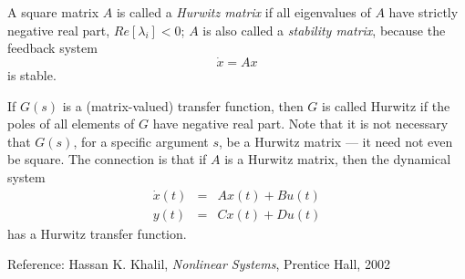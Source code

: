 \documentclass[12pt]{article}
\begin{document}
A square matrix $A$ is called a {\em Hurwitz matrix} if all eigenvalues of $A$ have strictly negative real part, $Re[\lambda_i] < 0$; $A$ is also called a {\em stability matrix}, because the feedback system
$$
    \dot x = A x
$$
is stable.

If $G(s)$ is a (matrix-valued) transfer function, then $G$ is called Hurwitz if the poles of all elements of $G$  have negative real part.  Note that it is not necessary that $G(s)$, for a specific argument $s$, be a Hurwitz matrix --- it need not even be square.  The c{}onnection is that if $A$ is a Hurwitz matrix, then the dynamical system
\begin{eqnarray*}
  \dot x(t) &=& A x(t) + B u(t) \\
  y(t) &=& C x(t) + D u(t)
\end{eqnarray*}
has a Hurwitz transfer function.

Reference:  Hassan K. Khalil, {\it Nonlinear Systems}, Prentice Hall, 2002
\end{document}
